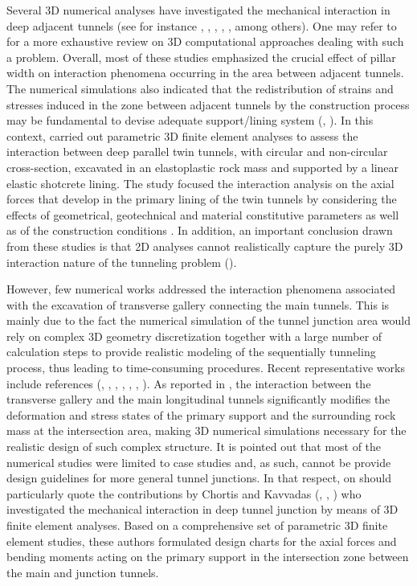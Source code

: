 \documentclass[Journal,letterpaper, NoLists,SectionNumbers]{ascelike-new}
\begin{document}
Several 3D numerical analyses have investigated the mechanical interaction in deep adjacent tunnels (see for instance , , , , , among others). One may refer to  for a more exhaustive review on 3D computational approaches dealing with such a problem. Overall, most of these studies emphasized the crucial effect of pillar width on interaction phenomena occurring in the area between adjacent tunnels. The numerical simulations also indicated that the redistribution of strains and stresses induced in the zone between adjacent tunnels by the construction process may be fundamental to devise adequate support/lining system (, ). In this context,  carried out parametric 3D finite element analyses to assess the interaction between deep parallel twin tunnels, with circular and non-circular cross-section, excavated in an elastoplastic rock mass and supported by a linear elastic shotcrete lining. The study focused the interaction analysis on the axial forces that develop in the primary lining of the twin tunnels by considering the effects of geometrical, geotechnical and material constitutive parameters as well as of the construction conditions . In addition, an important conclusion drawn from these studies is that 2D analyses cannot realistically capture the purely 3D interaction nature of the tunneling problem ().

However, few numerical works addressed the interaction phenomena associated with the excavation of transverse gallery connecting the main tunnels. This is mainly due to the fact the numerical simulation of the tunnel junction area would rely on complex 3D geometry discretization together with a large number of calculation steps to provide realistic modeling of the sequentially tunneling process, thus leading to time-consuming procedures. Recent representative works include references (, , , , , , ). As reported in , the interaction between the transverse gallery and the main longitudinal tunnels significantly modifies the deformation and stress states of the primary support and the surrounding rock mass at the intersection area, making 3D numerical simulations necessary for the realistic design of such complex structure. It is pointed out that most of the numerical studies were limited to case studies and, as such, cannot be provide design guidelines for more general tunnel junctions. In that respect, on should particularly quote the contributions by Chortis and Kavvadas (, , ) who investigated the mechanical interaction in deep tunnel junction by means of 3D finite element analyses. Based on a comprehensive set of parametric 3D finite element studies, these authors formulated design charts for the axial forces and bending moments acting on the primary support in the intersection zone between the main and junction tunnels.
\end{document}
